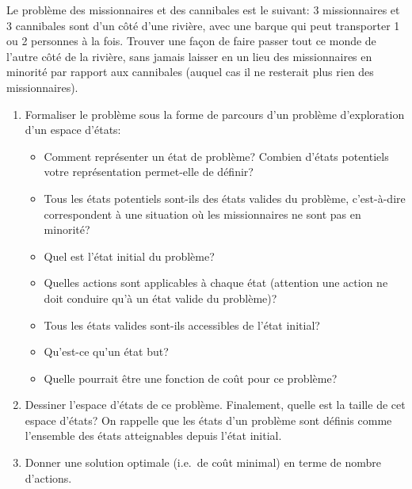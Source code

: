 \begin{td-exo} %
	Le problème des missionnaires et des cannibales est le suivant:
	3 missionnaires et 3 cannibales sont d'un côté d'une rivière, avec une barque
	qui peut transporter 1 ou 2 personnes à la fois. Trouver une façon de faire
	passer tout ce monde de l'autre côté de la rivière, sans jamais laisser en
	un lieu des missionnaires en minorité par rapport aux cannibales (auquel cas
	il ne resterait plus rien des missionnaires).

	\begin{enumerate}
		\item Formaliser le problème sous la forme de parcours
		d'un problème d'exploration d'un espace d'états:
		\begin{itemize}
			\item Comment représenter un état de problème? Combien d'états
			\og{}potentiels\fg{} votre représentation permet-elle de définir?

			\item Tous les états potentiels sont-ils des états \og{}valides\fg{} du
			problème, c'est-à-dire correspondent à une situation où les missionnaires
			ne sont pas en minorité?

			\item Quel est l'état initial du problème?
			
			\item Quelles actions sont applicables à chaque état (attention une action
			ne doit conduire qu'à un état valide du problème)?

			\item Tous les états valides sont-ils accessibles de l'état initial?

			\item Qu'est-ce qu'un état but?

			\item Quelle pourrait être une fonction de coût pour ce problème?
		\end{itemize}

		\item Dessiner l'espace d'états de ce problème. Finalement, quelle est la taille
		de cet espace d'états? On rappelle que les états d'un problème sont définis
		comme l'ensemble des états atteignables depuis l'état initial.

		\item Donner une solution optimale (i.e.\ de coût minimal) en terme de nombre
		d'actions.


\end{enumerate}
\end{td-exo}
